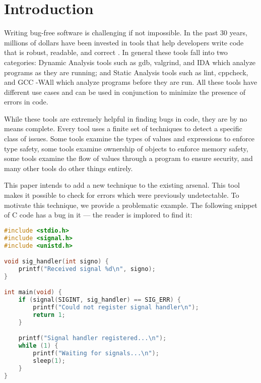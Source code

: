 \chapter{Introduction}\label{sec:intro}

Writing bug-free software is challenging if not impossible.  In the past 30 years, millions of dollars have been invested in tools that help developers write code that is robust, readable, and correct \cite{staticanal}.  In general these tools fall into two categories:  Dynamic Analysis tools such as gdb, valgrind, and IDA which analyze programs as they are running; and Static Analysis tools such as lint, cppcheck, and GCC -WAll which analyze programs before they are run.  All these tools have different use cases and can be used in conjunction to minimize the presence of errors in code.

While these tools are extremely helpful in finding bugs in code, they are by no means complete.  Every tool uses a finite set of techniques to detect a specific class of issues.  Some tools examine the types of values and expressions to enforce type safety\cite{staticanal}, some tools examine ownership of objects to enforce memory safety\cite{rust-is-dope}, some tools examine the flow of values through a program to ensure security\cite{jqual-inference}, and many other tools do other things entirely.  

This paper intends to add a new technique to the existing arsenal.  This tool makes it possible to check for errors which were previously undetectable.  To motivate this technique, we provide a problematic example.  The following snippet of C code has a bug in it --- the reader is implored to find it:

\noindent\begin{minipage}[c]{0.95\textwidth}
\begin{lstlisting}[language=C]
#include <stdio.h>
#include <signal.h>
#include <unistd.h>

void sig_handler(int signo) {
    printf("Received signal %d\n", signo);
}

int main(void) {
    if (signal(SIGINT, sig_handler) == SIG_ERR) {
        printf("Could not register signal handler\n");
        return 1;
    }

    printf("Signal handler registered...\n");
    while (1) {
        printf("Waiting for signals...\n");
        sleep(1);
    }
}
\end{lstlisting}
\end{minipage}

